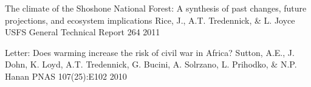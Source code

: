 \begin{pubentries}
  \pubentry
    {The climate of the Shoshone National Forest: A synthesis of past changes, future projections, and ecosystem implications} %
    {Rice, J., A.T. Tredennick, \& L. Joyce} %
    {USFS General Technical Report} %
    {264} %
    {2011} %

  \pubentry
    {Letter: Does warming increase the risk of civil war in Africa?} %
    {Sutton, A.E., J. Dohn, K. Loyd, A.T. Tredennick, G. Bucini, A. Solrzano, L. Prihodko, \& N.P. Hanan} %
    {PNAS} %
    {107(25):E102} %
    {2010} %


\end{pubentries}
